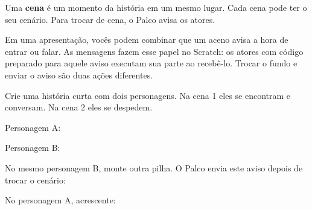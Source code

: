 Uma \textbf{cena} é um momento da história em um mesmo lugar. Cada cena pode ter o seu cenário. Para trocar de cena, o Palco avisa os atores.

\begin{pensaassim}
Em uma apresentação, vocês podem combinar que um aceno avisa a hora de entrar ou falar. As mensagens fazem esse papel no Scratch: os atores com código preparado para aquele aviso executam sua parte ao recebê-lo. Trocar o fundo e enviar o aviso são duas ações diferentes.
\end{pensaassim}

\begin{codigo}
\begin{pilha}
\end{pilha}
\end{codigo}

\begin{missao}
Crie uma história curta com dois personagens. Na cena 1 eles se encontram e conversam. Na cena 2 eles se despedem.
\end{missao}

\begin{codigo}
Personagem A:
\begin{pilha}
\end{pilha}
Personagem B:
\begin{pilha}
\end{pilha}
No mesmo personagem B, monte outra pilha. O Palco envia este aviso depois de trocar o cenário:
\begin{pilha}
\end{pilha}
No personagem A, acrescente:
\begin{pilha}
\end{pilha}
\end{codigo}

